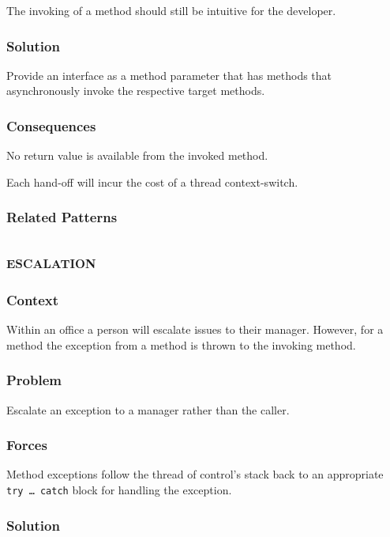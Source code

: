 \documentclass[prodmode]{style/acmlarge}
\begin{document}
The invoking of a method should still be intuitive for the developer.

\subsubsection*{Solution}

Provide an interface as a method parameter that has methods that asynchronously
invoke the respective target methods.

\subsubsection*{Consequences}

No return value is available from the invoked method.

Each hand-off will incur the cost of a thread context-switch.

\subsubsection*{Related Patterns}



\subsection{\textsc{\textbf{escalation}}}

\subsubsection*{Context}

Within an office a person will escalate issues to their manager.  However, for a
method the exception from a method is thrown to the invoking method.

\subsubsection*{Problem}

Escalate an exception to a manager rather than the caller.

\subsubsection*{Forces}

Method exceptions follow the thread of control's stack back to an appropriate
\texttt{try~\ldots~catch} block for handling the exception.

\subsubsection*{Solution}
\end{document}
